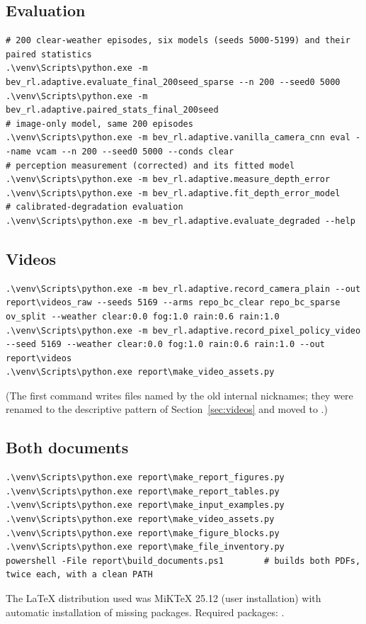 \subsection{Evaluation}
\begin{lstlisting}
# 200 clear-weather episodes, six models (seeds 5000-5199) and their paired statistics
.\venv\Scripts\python.exe -m bev_rl.adaptive.evaluate_final_200seed_sparse --n 200 --seed0 5000
.\venv\Scripts\python.exe -m bev_rl.adaptive.paired_stats_final_200seed
# image-only model, same 200 episodes
.\venv\Scripts\python.exe -m bev_rl.adaptive.vanilla_camera_cnn eval --name vcam --n 200 --seed0 5000 --conds clear
# perception measurement (corrected) and its fitted model
.\venv\Scripts\python.exe -m bev_rl.adaptive.measure_depth_error
.\venv\Scripts\python.exe -m bev_rl.adaptive.fit_depth_error_model
# calibrated-degradation evaluation
.\venv\Scripts\python.exe -m bev_rl.adaptive.evaluate_degraded --help
\end{lstlisting}

\subsection{Videos}
\begin{lstlisting}
.\venv\Scripts\python.exe -m bev_rl.adaptive.record_camera_plain --out report\videos_raw --seeds 5169 --arms repo_bc_clear repo_bc_sparse ov_split --weather clear:0.0 fog:1.0 rain:0.6 rain:1.0
.\venv\Scripts\python.exe -m bev_rl.adaptive.record_pixel_policy_video --seed 5169 --weather clear:0.0 fog:1.0 rain:0.6 rain:1.0 --out report\videos
.\venv\Scripts\python.exe report\make_video_assets.py
\end{lstlisting}
(The first command writes files named by the old internal nicknames; they were renamed to the descriptive pattern of Section~\ref{sec:videos} and moved to .)

\subsection{Both documents}
\begin{lstlisting}
.\venv\Scripts\python.exe report\make_report_figures.py
.\venv\Scripts\python.exe report\make_report_tables.py
.\venv\Scripts\python.exe report\make_input_examples.py
.\venv\Scripts\python.exe report\make_video_assets.py
.\venv\Scripts\python.exe report\make_figure_blocks.py
.\venv\Scripts\python.exe report\make_file_inventory.py
powershell -File report\build_documents.ps1        # builds both PDFs, twice each, with a clean PATH
\end{lstlisting}
The LaTeX distribution used was MiKTeX 25.12 (user installation) with automatic installation of missing packages. Required packages: .

